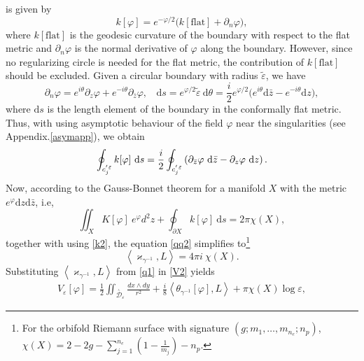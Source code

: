\documentclass[a4paper,11pt]{article}
\newcommand{\dd}{\mathrm{d}}
\newcommand{\singfund}{\overset{{}_{\curlywedge}}{\mathcal{D}}}
\newcommand{\stks}[1]{
	 \left< #1 \right>
}
\begin{document}
is given by
\begin{equation}
k[\varphi] =e^{-\varphi/2}\big(k[\text{flat}] +\partial_{n}\varphi\big),
\end{equation}
where $k[\text{flat}]$ is the geodesic curvature of the boundary with respect to the flat metric and $\partial_{n}\varphi$ is the normal derivative of $\varphi$ along the boundary. However, since no regularizing circle is needed for the flat metric, the contribution of $k[\text{flat}]$ should be excluded.  Given a circular boundary with radius $\tilde{\varepsilon}$, we have
\begin{equation}
\partial_{n}\varphi= e^{i\theta}\partial_{z}\varphi +e^{-i\theta}\partial_{\bar{z}}\varphi,~~~~\dd s=e^{\varphi/2}\tilde{\varepsilon}~\dd\theta= \frac{i}{2}e^{\varphi/2}\big(e^{i\theta}\dd\bar{z}-e^{-i\theta}\dd z\big),\label{k1}
\end{equation}
where $\dd s$ is the length element of the boundary in the conformally flat metric. Thus, with using asymptotic behaviour of the field $\varphi$ near the  singularities (see Appendix.\ref{asymapp}), we obtain
\begin{equation}
\oint_{c_{j}^{'\tilde{\varepsilon}}} k[\varphi] ~\dd s =\frac{i}{2}\oint_{c_{j}^{'\hspace{.2mm}\tilde{\varepsilon}}}\left(\partial_{\bar{z}}\varphi ~\dd\bar{z}-\partial_{z}\varphi~ \dd z\right).\label{k2}
\end{equation}
Now, according to the Gauss-Bonnet theorem for a manifold $X$ with the metric $e^{\varphi}\dd z \dd \bar{z}$, i.e,
\begin{equation}
\iint_{X} K[\varphi] ~e^{\varphi}d^2z +\oint_{\partial X}k[\varphi]~ \dd s= 2\pi \chi(X),
\end{equation}
together with using \eqref{k2}, the equation \eqref{qq2} simplifies  to\footnote{For the orbifold Riemann surface with signature $\left(g;m_1,\dots, m_{n_e};n_p\right)$,  $\chi(X)=2-2g-\sum_{j=1}^{n_e}(1-\frac{1}{m_j})-n_p.$}
\begin{equation}
\stks{\varkappa_{\gamma^{-1}},L} = 4\pi i~ \chi(X).\label{q1}
\end{equation}
Substituting $\stks{\varkappa_{\gamma^{-1}},L}$ from \eqref{q1} in \eqref{V2} yields
\begin{equation}
\begin{aligned}
V_\varepsilon[\varphi] = \frac12 \iint_{\singfund_{\varepsilon}} \frac{dx\wedge dy}{r^2}  +\frac{i}{8} \stks{\theta_{\gamma^{-1}}[\varphi],L}+ \pi \chi(X) \log\varepsilon,
\end{aligned}
\label{Veps}
\end{equation}
\end{document}
